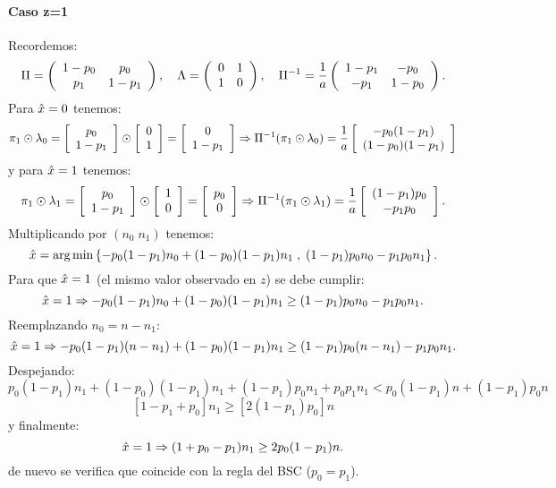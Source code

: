 \documentclass{article}
\begin{document}
\paragraph{Caso z=1}
Recordemos:
\[
\Pi=\left(
\begin{array}{cc}
1-p_0 & p_0 \\
p_1   & 1-p_1 
\end{array}
\right),
\quad
\Lambda=\left(
\begin{array}{cc}
0 & 1 \\
1   & 0 
\end{array}
\right),
\quad
\Pi^{-1}=\frac{1}{a}\left(
\begin{array}{cc}
1-p_1 & -p_0 \\
-p_1   & 1-p_0 
\end{array}
\right).
\]
Para $\hat{x}=0$ tenemos: 
\[
\pi_1 \odot \lambda_0=\left[
\begin{array}{c}
p_0 \\
1-p_1   
\end{array}
\right] \odot
\left[
\begin{array}{c}
0 \\
1   
\end{array}
\right] = \left[
\begin{array}{c}
0 \\
1-p_1   
\end{array}
\right] 
\Rightarrow 
\Pi^{-1}(\pi_1 \odot \lambda_0) = \frac{1}{a}
\left[
\begin{array}{c}
-p_0(1-p_1) \\
(1-p_0)(1-p_1) 
\end{array}
\right]
\]
y para $\hat{x}=1$ tenemos:
\[
\pi_1 \odot \lambda_1=\left[
\begin{array}{c}
p_0 \\
1-p_1   
\end{array}
\right] \odot
\left[
\begin{array}{c}
1 \\
0   
\end{array}
\right] = \left[
\begin{array}{c}
p_0 \\
0   
\end{array}
\right]
\Rightarrow
\Pi^{-1}(\pi_1 \odot \lambda_1) = \frac{1}{a}
\left[
\begin{array}{c}
(1-p_1)p_0 \\
-p_1p_0
\end{array}
\right].
\]
Multiplicando por $(n_0\;n_1)$ tenemos:
\[
\hat{x} = \arg\min \left\{
-p_0(1-p_1)n_0 + (1-p_0)(1-p_1)n_1
\;,\;
(1-p_1)p_0n_0 - p_1p_0n_1
\right\}.
\]
Para que $\hat{x}=1$ (el mismo valor observado en $z$) se debe cumplir:
$$
\hat{x}=1 \Rightarrow -p_0(1-p_1)n_0 + (1-p_0)(1-p_1)n_1
\geq
(1-p_1)p_0n_0 - p_1p_0n_1.
$$
Reemplazando $n_0=n-n_1$:
$$
\hat{x}=1 \Rightarrow -p_0(1-p_1)(n-n_1) + (1-p_0)(1-p_1)n_1
\geq
(1-p_1)p_0(n-n_1) - p_1p_0n_1.
$$
Despejando:
$$
p_0(1-p_1)n_1 + (1-p_0)(1-p_1)n_1 + (1-p_1)p_0n_1 + p_0p_1n_1 
< 
p_0(1-p_1)n + (1-p_1)p_0n 
$$
$$
[1-p_1+p_0]n_1 \geq [2(1-p_1)p_0]n
$$
y finalmente:
$$
\hat{x}=1 \Rightarrow (1 + p_0-p_1)n_1 \geq 2p_0(1-p_1)n.
$$
de nuevo se verifica que coincide con la regla del BSC ($p_0=p_1$).
\end{document}
